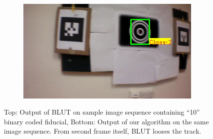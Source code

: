 \documentclass[runningheads]{llncs}
\begin{document}
\begin{figure}
\begin{subfigure}[b]{.19\textwidth}
\end{subfigure}
\begin{subfigure}[b]{.19\textwidth}
\includegraphics[width=\linewidth]{BLUT_input_10/output5.jpg}
\end{subfigure}
\caption{Top: Output of BLUT\cite{Wu:2011} on sample image sequence containing
``10'' binary coded fiducial, Bottom: Output of our algorithm on the same image
sequence. From second frame itself, BLUT looses the track.}
\label{fig:BLUT_compare_10}
\end{figure}
\end{document}
